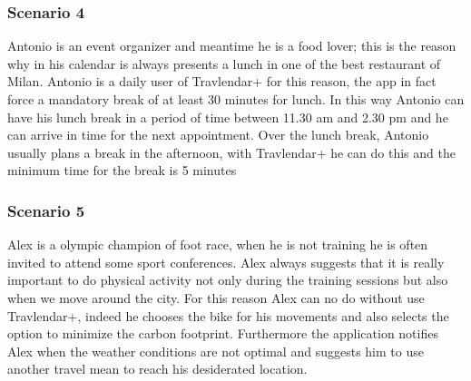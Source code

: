 \subsubsection{Scenario 4}
Antonio is an event organizer and meantime he is a food lover; this is the reason why in his calendar is always presents a lunch in one of the best restaurant of Milan. Antonio is a daily user of Travlendar+ for this reason, the app in fact force a mandatory break of at least 30 minutes for lunch. In this way Antonio can have his lunch break in a period of time between 11.30 am and 2.30 pm and he can arrive in time for the next appointment. Over the lunch break, Antonio usually plans a break in the afternoon, with Travlendar+ he can do this and the minimum time for the break is 5 minutes

\subsubsection{Scenario 5}
Alex is a olympic champion of foot race, when he is not training he is often invited to attend some sport conferences. Alex always suggests that it is really important to do physical activity not only during the training sessions but also when we move around the city. For this reason Alex can no do without use Travlendar+, indeed he chooses the bike for his movements and also selects the option to minimize the carbon footprint. Furthermore the application notifies Alex when the weather conditions are not optimal and suggests him to use another travel mean to reach his desiderated location.
